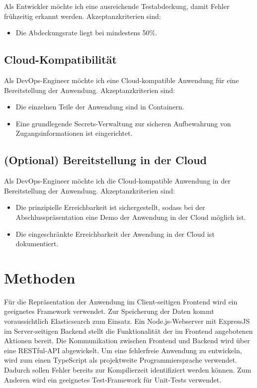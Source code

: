 \documentclass[a4paper, 10pt, conference]{ieeeconf}
\begin{document}
Als Entwickler möchte ich eine ausreichende Testabdeckung,  damit Fehler frühzeitig erkannt werden.  Akzeptanzkriterien sind:
\begin{itemize}
\item Die Abdeckungsrate liegt bei mindestens 50\%.
\end{itemize}

\subsection{Cloud-Kompatibilität}

Als DevOps-Engineer möchte ich eine Cloud-kompatible Anwendung für eine Bereitstellung der Anwendung.  Akzeptanzkriterien sind:
\begin{itemize}
\item Die einzelnen Teile der Anwendung sind in Containern.
\item Eine grundlegende Secrets-Verwaltung zur sicheren Aufbewahrung von Zugangsinformationen ist eingerichtet.
\end{itemize}

\subsection{(Optional) Bereitstellung in der Cloud}

Als DevOps-Engineer möchte ich die Cloud-kompatible Anwendung in der  Bereitstellung der Anwendung.  Akzeptanzkriterien sind:
\begin{itemize}
\item Die prinzipielle Erreichbarkeit ist sichergestellt,  sodass bei der Abschlusspräsentation eine Demo der Anwendung in der Cloud möglich ist.
\item Die eingeschränkte Erreichbarkeit der Awendung in der Cloud ist dokumentiert.
\end{itemize}


\section{Methoden} \label{s:methoden}

Für die Repräsentation der Anwendung im Client-seitigen Frontend wird ein geeignetes Framework verwendet.  Zur Speicherung der Daten kommt voraussichtlich Elasticsearch zum Einsatz. Ein Node.js-Webserver mit ExpressJS im Server-seitigen Backend stellt die Funktionalität der im Frontend angebotenen Aktionen bereit.  Die Kommunikation zwischen Frontend und Backend wird über eine RESTful-API abgewickelt. Um eine fehlerfreie Anwendung zu entwickeln, wird zum einen TypeScript als projektweite Programmiersprache verwendet. Dadurch sollen Fehler bereits zur Kompilierzeit identifiziert werden können. Zum Anderen wird ein geeignetes Test-Framework für Unit-Tests verwendet.

\printbibliography
\end{document}
